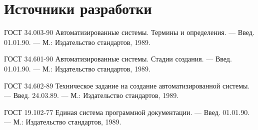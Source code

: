 \chapter{Источники разработки}

\par
	ГОСТ 34.003-90 Автоматизированные системы. Термины и определения. — Введ. 01.01.90. — М.: Издательство стандартов, 1989. 

	ГОСТ 34.601-90 Автоматизированные системы. Стадии создания. — Введ. 01.01.90. — М.: Издательство стандартов, 1989. 

	ГОСТ 34.602-89 Техническое задание на создание автоматизированной системы. — Введ. 24.03.89. — М.: Издательство стандартов, 1989. 
	
	ГОСТ 19.102-77 Единая система программной документации. — Введ. 01.01.90. — М.: Издательство стандартов, 1989.
